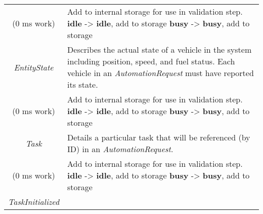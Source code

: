 \begin{longtable}[]{@{}cl@{}}
\begin{minipage}[t]{0.4\columnwidth}\centering\strut
(0 ms work)\strut
\end{minipage} & \begin{minipage}[t]{0.55\columnwidth}\raggedright\strut
Add to internal storage for use in validation step. \textbf{idle}
-\textgreater{} \textbf{idle}, add to storage \textbf{busy}
-\textgreater{} \textbf{busy}, add to storage\strut
\end{minipage}\tabularnewline
\begin{minipage}[t]{0.4\columnwidth}\centering\strut
\emph{EntityState}\strut
\end{minipage} & \begin{minipage}[t]{0.55\columnwidth}\raggedright\strut
Describes the actual state of a vehicle in the system including
position, speed, and fuel status. Each vehicle in an
\emph{AutomationRequest} must have reported its state.\strut
\end{minipage}\tabularnewline
\begin{minipage}[t]{0.4\columnwidth}\centering\strut
(0 ms work)\strut
\end{minipage} & \begin{minipage}[t]{0.55\columnwidth}\raggedright\strut
Add to internal storage for use in validation step. \textbf{idle}
-\textgreater{} \textbf{idle}, add to storage \textbf{busy}
-\textgreater{} \textbf{busy}, add to storage\strut
\end{minipage}\tabularnewline
\begin{minipage}[t]{0.4\columnwidth}\centering\strut
\emph{Task}\strut
\end{minipage} & \begin{minipage}[t]{0.55\columnwidth}\raggedright\strut
Details a particular task that will be referenced (by ID) in an
\emph{AutomationRequest}.\strut
\end{minipage}\tabularnewline
\begin{minipage}[t]{0.4\columnwidth}\centering\strut
(0 ms work)\strut
\end{minipage} & \begin{minipage}[t]{0.55\columnwidth}\raggedright\strut
Add to internal storage for use in validation step. \textbf{idle}
-\textgreater{} \textbf{idle}, add to storage \textbf{busy}
-\textgreater{} \textbf{busy}, add to storage\strut
\end{minipage}\tabularnewline
\begin{minipage}[t]{0.4\columnwidth}\centering\strut
\emph{TaskInitialized}\strut

\end{minipage}
\end{longtable}
